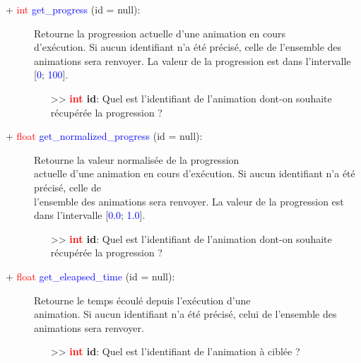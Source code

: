 \documentclass[a4paper, 11pt]{article}
\begin{document}
	\begin{description}
		\item [+ \textcolor{red}{int} \textcolor{blue}{get\_progress} (id = null):] Retourne la progression
		actuelle d'une animation en cours \\d'exécution. Si aucun identifiant n'a été précisé, celle de 
		l'ensemble des animations sera renvoyer. La valeur de la progression est dans l'intervalle 
		[\textcolor{blue}{0}; \textcolor{blue}{100}].
		\begin{itemize}
			\item [>> \textbf{\textcolor{red}{int} id}:] Quel est l'identifiant de l'animation dont-on 
			souhaite récupérée la progression ?\\
		\end{itemize}
	\end{description}
	\begin{description}
		\item [+ \textcolor{red}{float} \textcolor{blue}{get\_normalized\_progress} (id = null):] Retourne 
		la valeur normalisée de la progression \\actuelle d'une animation en cours d'exécution. Si aucun 
		identifiant n'a été précisé, celle de \\l'ensemble des animations sera renvoyer. La valeur de la 
		progression est dans l'intervalle [\textcolor{blue}{0.0}; \textcolor{blue}{1.0}].
		\begin{itemize}
			\item [>> \textbf{\textcolor{red}{int} id}:] Quel est l'identifiant de l'animation dont-on 
			souhaite récupérée la progression ?\\
		\end{itemize}
	\end{description}
	\begin{description}
		\item [+ \textcolor{red}{float} \textcolor{blue}{get\_eleapsed\_time} (id = null):] Retourne le 
		temps écoulé depuis l'exécution d'une \\animation. Si aucun identifiant n'a été précisé, celui de 
		l'ensemble des animations sera renvoyer.
		\begin{itemize}
			\item [>> \textbf{\textcolor{red}{int} id}:] Quel est l'identifiant de l'animation à ciblée ?\\
		\end{itemize}
	\end{description}
\end{document}
